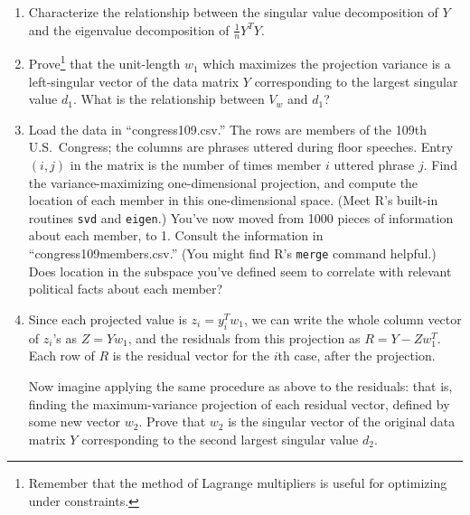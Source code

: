 \documentclass{mynotes}
\begin{document}
\begin{enumerate}

\item Characterize the relationship between the singular value decomposition of $Y$ and the eigenvalue decomposition of $\frac{1}{n} Y^T Y$.

\item Prove\footnote{Remember that the method of Lagrange multipliers is useful for optimizing under constraints.} that the unit-length $w_1$ which maximizes the projection variance is a left-singular vector of the data matrix $Y$ corresponding to the largest singular value $d_1$.  What is the relationship between $V_w$ and $d_1$?

\item Load the data in ``congress109.csv.''  The rows are members of the 109th U.S.~Congress; the columns are phrases uttered during floor speeches.  Entry $(i,j)$ in the matrix is the number of times member $i$ uttered phrase $j$.  Find the variance-maximizing one-dimensional projection, and compute the location of each member in this one-dimensional space.  (Meet R's built-in routines \verb|svd| and \verb|eigen|.) You've now moved from 1000 pieces of information about each member, to 1.  Consult the information in ``congress109members.csv.''  (You might find R's \verb|merge| command helpful.)  Does location in the  subspace you've defined seem to correlate with relevant political facts about each member?

\item Since each projected value is $z_i = y_i^T w_1$, we can write the whole column vector of $z_i$'s as $Z = Y w_1$, and the residuals from this projection as $R = Y - Z w_1^T$.  Each row of $R$ is the residual vector for the $i$th case, after the projection.

Now imagine applying the same procedure as above to the residuals: that is, finding the maximum-variance projection of each residual vector, defined by some new vector $w_2$.  Prove that $w_2$ is the singular vector of the original data matrix $Y$ corresponding to the second largest singular value $d_2$.

\end{enumerate}
\end{document}
